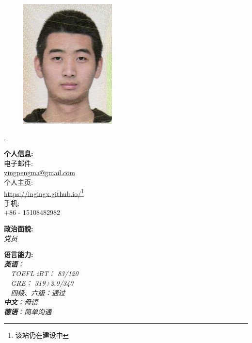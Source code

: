 \documentclass[a4paper,11pt,final]{memoir}
\newcommand{\myThemeColor}{RoyalBlue}
\newcommand{\CVItem}[1]
	{\textbf{\color{\myThemeColor} #1}}
\begin{document}
\begin{CJK*}{UTF8}{gbsn}%
\begin{figure}
	\hfill
	\includegraphics[width=0.8\columnwidth]{avatar1}
	\vspace{-7cm}
\end{figure}
\begin{flushright}\footnotesize
.\\
\vskip 7cm
    \raggedright
	\CVItem{{\large 个人信息:}}\\
	电子邮件:\\
	\href{mailto:yingpengma@gmail.com}{yingpengma@gmail.com}  \\
	个人主页:\\
	\href{https://ingingx.github.io/}{https://ingingx.github.io/}\footnote{该站仍在建设中} \\
	手机:\\
	+86 - 15108482982

	\CVItem{{\large 政治面貌:}}\\
	\textit{党员}

		
	\CVItem{{\large 语言能力:}}\\
	\textit{\textbf{英语}：\\
		    ~~TOEFL iBT： 83/120\\
		    ~~GRE： 319+3.0/340\\
		    ~~四级、六级：通过\\
		   \textbf{中文}：母语 \\ 
		   \textbf{德语}：简单沟通
			}
	

\end{flushright}
\end{CJK*}
\end{document}
